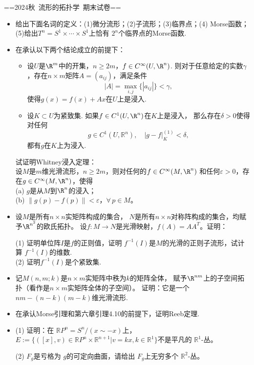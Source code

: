 ==2024秋\ 流形的拓扑学\ 期末试卷==

\begin{itemize}
    \item[1.] 给出下面名词的定义：(1)微分流形；(2)子流形；(3)临界点；(4) Morse函数；(5)给出$T^n=S^1\times\cdots\times S^1$上恰有 $2^n$个临界点的Morse函数.
    \item[2.] 在承认以下两个结论成立的前提下：
\begin{itemize}
	\item [(a)] 设$U$是$\R^m$中的开集，$n\geq 2m$，$f\in C^\infty(U,\R^n)$. 
    则对于任意给定的实数$\gamma$，存在$n\times m$矩阵$A=(a_{ij})$，满足条件
	$$|A|=\max_{i,j}\{|a_{ij}|\}<\gamma,$$使得$g(x)=f(x)+Ax$在$U$上是浸入.
	\item [(b)] 设$K\subset U$为紧致集. 如果$f\in C^1(U,\R^n)$在$K$上是浸入，
    那么存在$\delta>0$使得对任何
	$$g\in C^1(U,\mathbb{R}^n), \quad |g-f|_K^{(1)}<\delta,$$
    都有$g$在$K$上为浸入.
\end{itemize}
试证明Whitney浸入定理：\\
设$M$是$m$维光滑流形，$n\ge2m$，则对任何的$f\in C^\infty(M,\R^n)$
和任何$\varepsilon>0$，存在$g\in C^\infty(M,\R^n)$，使得\\
 (a) $g$是从$M$到$\R^n$的浸入；\\
 (b) $\|g(p)-f(p)\|<\varepsilon$，$\forall\,p\in M$。
    \item[3.]设$M$是所有$n\times n$实矩阵构成的集合，
$N$是所有$n\times n$对称阵构成的集合，均赋予$\R^{n^2}$的欧氏拓扑。
设$f\colon M\to N$是光滑映射，$f(A)=AA^T$。证明：

(1) 证明单位阵$I$是$f$的正则值，证明 $f^{-1}(I)$是$M$的光滑的正则子流形，试计算 $f^{-1}(I)$的维数. \\

(2) 证明$f^{-1}(I)$是个紧致集.
\item[4.] 记$M(n,m;k)$是$n\times m$实矩阵中秩为$k$的矩阵全体，
赋予$\R^{nm}$上的子空间拓扑（看作是$n\times m$实矩阵全体的子空间）。
证明：它是一个$nm-(n-k)(m-k)$维光滑流形.

\item[5.]在承认Morse引理和第六章引理4.10的前提下，证明Reeb定理.
\item[6.](1) 证明：在 $\mathbb{R}P^n=S^n/(x\sim -x)$上，
$E:=\{([x],v)\in\mathbb{R}P^n\times \mathbb{R}^{n+1}|v=kx, k\in\mathbb{R}^1\}$不是平凡的 $\mathbb{R}^1$-丛。

(2) $F_g$是亏格为 $g$的可定向曲面，请给出 $F_g$上无穷多个 $\mathbb{R}^2$-丛。
\end{itemize}

